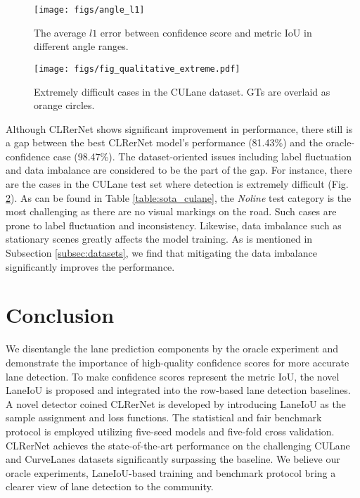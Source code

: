 \documentclass[10pt,twocolumn,letterpaper]{article}
\begin{document}
\begin{figure}[t]
\begin{center}
 \texttt{[image: figs/angle\_l1]}
\end{center}
   \caption{The average $l1$ error between confidence score and metric IoU in different angle ranges.}
\label{fig:angle_l1}
\end{figure}


\begin{figure}[t]
\begin{center}
   \texttt{[image: figs/fig\_qualitative\_extreme.pdf]}
  \end{center}
\caption{Extremely difficult cases in the CULane dataset. GTs are overlaid as orange circles.}
\label{fig:qualitative_extreme}
\end{figure}

 Although CLRerNet shows significant improvement in performance, there still is a gap between the best CLRerNet model's performance (81.43\%) and the oracle-confidence case (98.47\%). 
The dataset-oriented issues including label fluctuation and data imbalance are considered to be the part of the gap. 
For instance, there are the cases in the CULane test set where detection is extremely difficult (Fig. \ref{fig:qualitative_extreme}). 
As can be found in Table \ref{table:sota_culane}, the \textit{Noline} test category is the most challenging as there are no visual markings on the road. Such cases are prone to label fluctuation and inconsistency. 
Likewise, data imbalance such as stationary scenes greatly affects the model training. As is mentioned in Subsection \ref{subsec:datasets}, we find that mitigating the data imbalance significantly improves the performance. 
\section{Conclusion}

We disentangle the lane prediction components by the oracle experiment and demonstrate the importance of high-quality confidence scores for more accurate lane detection.
To make confidence scores represent the metric IoU, the novel LaneIoU is proposed and integrated into the row-based lane detection baselines.
A novel detector coined CLRerNet is developed by introducing LaneIoU as the sample assignment and loss functions.
The statistical and fair benchmark protocol is employed utilizing five-seed models and five-fold cross validation.
CLRerNet achieves the state-of-the-art performance on the challenging CULane and CurveLanes datasets significantly surpassing the baseline.
We believe our oracle experiments, LaneIoU-based training and benchmark protocol bring a clearer view of lane detection to the community.
\clearpage
{\small


}
\end{document}

